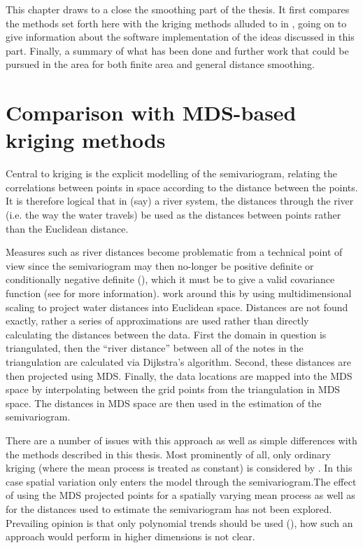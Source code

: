 \label{chap-fasend}

This chapter draws to a close the smoothing part of the thesis. It first compares the methods set forth here with the kriging methods alluded to in , going on to give information about the software implementation of the ideas discussed in this part. Finally, a summary of what has been done and further work that could be pursued in the area for both finite area and general distance smoothing.

\section{Comparison with MDS-based kriging methods}
\label{gds-krig}

Central to kriging is the explicit modelling of the semivariogram, relating the correlations between points in space according to the distance between the points. It is therefore logical that in (say) a river system, the distances through the river (i.e. the way the water travels) be used as the distances between points rather than the Euclidean distance. 

Measures such as river distances become problematic from a technical point of view since the semivariogram may then no-longer be positive definite or conditionally negative definite (), which it must be to give a valid covariance function (see \cite[p. 47]{diggle} for more information).   work around this by using multidimensional scaling to project water distances into Euclidean space. Distances are not found exactly, rather a series of approximations are used rather than directly calculating the distances between the data. First the domain in question is triangulated, then the ``river distance'' between all of the notes in the triangulation are calculated via Dijkstra's algorithm. Second, these distances are then projected using MDS. Finally, the data locations are mapped into the MDS space by interpolating between the grid points from the triangulation in MDS space.  The distances in MDS space are then used in the estimation of the semivariogram.

There are a number of issues with this approach as well as simple differences with the methods described in this thesis. Most prominently of all, only ordinary kriging (where the mean process is treated as constant) is considered by \cite{mdskrig}. In this case spatial variation only enters the model through the semivariogram.The effect of using the MDS projected points for a spatially varying mean process as well as for the distances used to estimate the semivariogram has not been explored. Prevailing opinion is that only polynomial trends should be used (\cite[p. 57]{diggle}), how such an approach would perform in higher dimensions is not clear.

